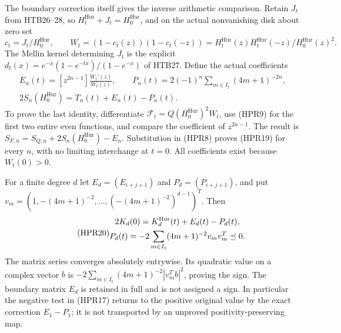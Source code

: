 The boundary correction itself gives the inverse arithmetic comparison.
Retain $J_t$ from HTB26--28, so $H_t^{\mathrm{Hur}}+J_t=H_0^{\mathrm{Hur}}$, and on the actual
nonvanishing disk about zero set
\[
 c_t=J_t/H_0^{\mathrm{Hur}},\qquad
 W_t=(1-c_t(z))(1-c_t(-z))=H_t^{\mathrm{Hur}}(z)H_t^{\mathrm{Hur}}(-z)/H_0^{\mathrm{Hur}}(z)^2.
\]
The Mellin kernel determining $J_t$ is the explicit
$d_t(x)=e^{-x}(1-e^{-tx})/(1-e^{-x})$ of HTB27.
Define the actual coefficients
\begin{equation}\tag{HPR19}
 \begin{gathered}
 E_n(t)=[z^{2n-1}]\frac{W_t'(z)}{W_t(z)},\qquad
 P_n(t)=2(-1)^n\sum_{m\in I_t}(4m+1)^{-2n},\\
 2S_n(H_0^{\mathrm{Hur}})=T_n(t)+E_n(t)-P_n(t).
 \end{gathered}
\end{equation}
To prove the last identity, differentiate
$\mathscr F_t=Q(H_0^{\mathrm{Hur}})^2W_t$, use (HPR9) for the first two entire even functions,
and compare the coefficient of $z^{2n-1}$. The result is
$S_{F,n}=S_{Q,n}+2S_n(H_0^{\mathrm{Hur}})-E_n$. Substitution in (HPR8) proves
(HPR19) for every $n$, with no limiting interchange at $t=0$.
All coefficients exist because $W_t(0)>0$.

For a finite degree $d$ let $E_d=(E_{i+j+1})$ and
$P_d=(P_{i+j+1})$, and put
$v_m=(1,-(4m+1)^{-2},\ldots,(-(4m+1)^{-2})^{d-1})^T$.
Then
\begin{equation}\tag{HPR20}
 \begin{gathered}
 2K_d(0)=K_d^{\rm Hur}(t)+E_d(t)-P_d(t),\\
 P_d(t)=-2\sum_{m\in I_t}(4m+1)^{-2}v_mv_m^T\preceq0.
 \end{gathered}
\end{equation}
The matrix series converges absolutely entrywise. Its quadratic value
on a complex vector $b$ is
$-2\sum_{m\in I_t}(4m+1)^{-2}|v_m^Tb|^2$, proving the sign.
The boundary matrix $E_d$ is retained in full and is not assigned a
sign. In particular the negative test in (HPR17) returns to the
positive original value by the exact correction $E_1-P_1$; it is
not transported by an unproved positivity-preserving map.

